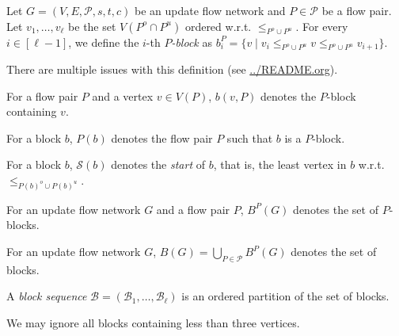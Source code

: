 \documentclass[fontsize=11pt,paper=a4]{book}
\begin{document}
\begin{defn}
Let \(G=(V,E,\mathcal{P},s,t,c)\) be an update flow network and \(P\in\mathcal{P}\) be a flow pair.
Let \(v_1,\dots,v_{\ell}\) be the set \(V(P^o\cap P^u)\) ordered w.r.t. \(\leq_{P^o\cup P^u}\).
For every \(i\in[\ell-1]\), we define the \(i\)-th \emph{\(P\)-block} as \(b_i^P=\{v\mid v_i\leq_{P^o\cup P^u}v\leq_{P^o\cup P^u}v_{i+1}\}\).
\label{org9c6a77a}
\end{defn}

\begin{remark}
There are multiple issues with this definition (see \url{../README.org}).
\end{remark}

\begin{notation}
For a flow pair \(P\) and a vertex \(v\in V(P)\), \(b(v,P)\) denotes the \(P\)-block containing \(v\).
\label{orgfdb53df}
\end{notation}

\begin{notation}
For a block \(b\), \(P(b)\) denotes the flow pair \(P\) such that \(b\) is a \(P\)-block.
\label{org1c8b784}
\end{notation}

\begin{notation}
For a block \(b\), \(\mathcal{S}(b)\) denotes the \emph{start} of \(b\), that is, the least vertex in \(b\) w.r.t. \(\leq_{P(b)^o\cup P(b)^u}\).
\label{org4f059d5}
\end{notation}

\begin{notation}
For an update flow network \(G\) and a flow pair \(P\), \(B^P(G)\) denotes the set of \(P\)-blocks.
\label{orged30f88}
\end{notation}

\begin{notation}
For an update flow network \(G\), \(B(G)=\bigcup_{P\in\mathcal{P}}B^P(G)\) denotes the set of blocks.
\label{org24d9ffb}
\end{notation}

\begin{defn}
A \emph{block sequence} \(\mathcal{B}=(\mathscr{B}_1,\dots,\mathscr{B}_{\ell})\) is an ordered partition of the set of blocks.
\label{orgcd26395}
\end{defn}

\begin{remark}
We may ignore all blocks containing less than three vertices.
\label{org5948f11}
\end{remark}
\end{document}
